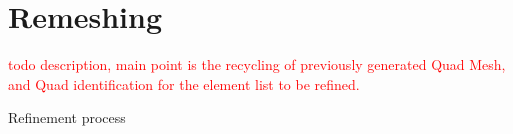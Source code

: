 \documentclass[10pt]{article}
\begin{document}
\section{Remeshing}
\label{sec:remeshing}
\textcolor{red}{todo description, main point is the recycling of previously generated Quad Mesh, and Quad identification for the element list to be refined.}

\begin{algorithm}[H]
\SetAlgoLined
{}
 \caption{Refinement process}
 \label{alg:refinement}
\end{algorithm}
\end{document}
